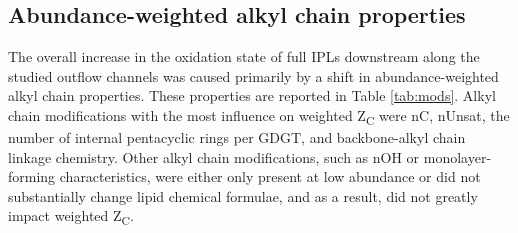 


\subsection{Abundance-weighted alkyl chain properties}
The overall increase in the oxidation state of full IPLs downstream along the studied outflow channels was caused primarily by a shift in abundance-weighted alkyl chain properties. These properties are reported in Table \ref{tab:mods}. Alkyl chain modifications with the most influence on weighted Z\textsubscript{C} were nC, nUnsat, the number of internal pentacyclic rings per GDGT, and backbone-alkyl chain linkage chemistry. Other alkyl chain modifications, such as nOH or monolayer-forming characteristics, were either only present at low abundance or did not substantially change lipid chemical formulae, and as a result, did not greatly impact weighted Z\textsubscript{C}.

